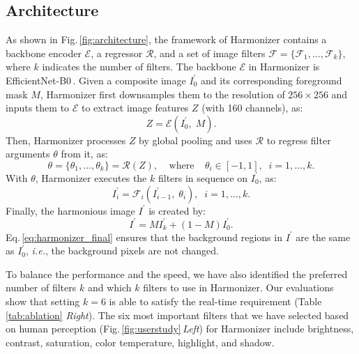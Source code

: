 \documentclass[runningheads]{llncs}
\begin{document}
\subsection{Architecture}\label{sec:architectural_details}
As shown in Fig.\,\ref{fig:architecture}, the framework of Harmonizer contains a backbone encoder $\mathcal{E}$, a regressor $\mathcal{R}$, and a set of image filters $\mathcal{F}=\{ \mathcal{F}_1, \dots, \mathcal{F}_k \}$, where $k$ indicates the number of filters.
The backbone $\mathcal{E}$ in Harmonizer is EfficientNet-B0\,\cite{EfficientNet}.
Given a composite image $I^{\prime}_{0}$ and its corresponding foreground mask $M$,
Harmonizer first downsamples them to the resolution of $256\times256$ and inputs them to $\mathcal{E}$ to extract image features $Z$ (with 160 channels), as:
\begin{equation}
    Z = \mathcal{E}(I^{\prime}_{0},\; M).
\end{equation}
Then, Harmonizer processes $Z$ by global pooling and uses $\mathcal{R}$ to regress filter arguments $\theta$ from it, as:
\begin{equation}
    \theta = \{\theta_1, \dots, \theta_k\} = \mathcal{R}(Z), \;\;\;\;\text{where}\;\;\;\; \theta_i \in [-1, 1],\;\; i=1, \dots, k.
\end{equation}
With $\theta$, Harmonizer executes the $k$ filters in sequence on $I^{\prime}_{0}$, as:
\begin{equation}
    I^{\prime}_{i} = \mathcal{F}_{i} (I^{\prime}_{i-1},\; \theta_{i}),\;\; i=1, \dots, k.
\end{equation}
Finally, the harmonious image $I^{\prime}$ is created by:
\begin{equation}\label{eq:harmonizer_final}
    I^{\prime} = M I^{\prime}_{k} + (1 - M) I^{\prime}_{0}.
\end{equation}
Eq.\,\ref{eq:harmonizer_final} ensures that the background regions in $I^{\prime}$ are the same as $I^{\prime}_{0}$, {\it i.e.}, the background pixels are not changed.



To balance the performance and the speed, we have also identified the preferred number of filters $k$ and which $k$ filters to use in Harmonizer. Our evaluations show that setting $k = 6$ is able to satisfy the real-time requirement (Table\,\ref{tab:ablation} {\it Right}). 
The six most important filters that we have selected based on human perception (Fig.\,\ref{fig:userstudy}\,\textit{Left}) for Harmonizer include brightness, contrast, saturation, color temperature, highlight, and shadow.
\end{document}
